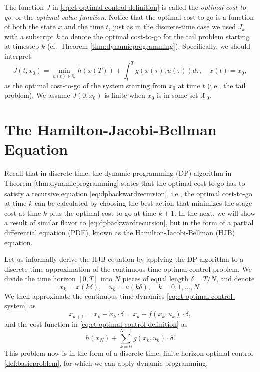 \documentclass[
]{book}
\theoremstyle{definition}
\theoremstyle{definition}
\theoremstyle{definition}
\theoremstyle{definition}
\theoremstyle{remark}
\begin{document}
The function \(J\) in \eqref{eq:ct-optimal-control-definition} is called the \emph{optimal cost-to-go}, or the \emph{optimal value function}. Notice that the optimal cost-to-go is a function of both the state \(x\) and the time \(t\), just as in the discrete-time case we used \(J_k\) with a subscript \(k\) to denote the optimal cost-to-go for the tail problem starting at timestep \(k\) (cf.~Theorem \ref{thm:dynamicprogramming}). Specifically, we should interpret
\[
J(t,x_0) = \min_{u(t) \in \mathbb{U}} h(x(T)) + \int_t^T g(x(\tau),u(\tau)) d\tau, \quad x(t) = x_0,
\]
as the optimal cost-to-go of the system starting from \(x_0\) at time \(t\) (i.e., the tail problem).
We assume \(J(0,x_0)\) is finite when \(x_0\) is in some set \(\mathcal{X}_0\).

\hypertarget{the-hamilton-jacobi-bellman-equation}{%
\section{The Hamilton-Jacobi-Bellman Equation}\label{the-hamilton-jacobi-bellman-equation}}

Recall that in discrete-time, the dynamic programming (DP) algorithm in Theorem \ref{thm:dynamicprogramming} states that the optimal cost-to-go has to satisfy a recursive equation \eqref{eq:dpbackwardrecursion}, i.e., the optimal cost-to-go at time \(k\) can be calculated by choosing the best action that minimizes the stage cost at time \(k\) plus the optimal cost-to-go at time \(k+1\). In the next, we will show a result of similar flavor to \eqref{eq:dpbackwardrecursion}, but in the form of a partial differential equation (PDE), known as the Hamilton-Jacobi-Bellman (HJB) equation.

Let us informally derive the HJB equation by applying the DP algorithm to a discrete-time approximation of the continuous-time optimal control problem. We divide the time horizon \([0,T]\) into \(N\) pieces of equal length \(\delta = T/N\), and denote
\[
x_k = x(k\delta), \quad u_k = u(k \delta), \quad k = 0,1,\dots,N.
\]
We then approximate the continuous-time dynamics \eqref{eq:ct-optimal-control-system} as
\[
x_{k+1} = x_k + \dot{x}_k \cdot \delta = x_k + f(x_k,u_k) \cdot \delta,
\]
and the cost function in \eqref{eq:ct-optimal-control-definition} as
\[
h(x_N) + \sum_{k=0}^{N-1} g(x_k, u_k)\cdot \delta.
\]
This problem now is in the form of a discrete-time, finite-horizon optimal control \ref{def:basicproblem}, for which we can apply dynamic programming.
\end{document}
